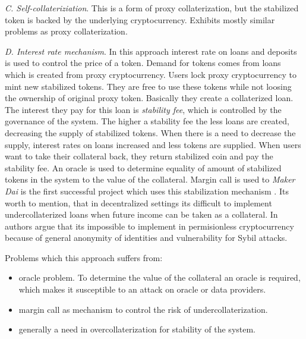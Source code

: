 \documentclass[12pt, a4paper, twocolumn]{article}
\begin{document}
\textit{C. Self-collateriziation}. This is a form of proxy collaterization, but the stabilized token is backed by the underlying cryptocurrency. Exhibits mostly similar problems as proxy collaterization.

\textit{D. Interest rate mechanism}. In this approach  interest rate on loans and deposits is used to control the price of a token. Demand for tokens comes from loans which is created from proxy cryptocurrency. Users lock proxy cryptocurrency to mint new stabilized tokens. They are free to use these tokens while not loosing the  ownership of original proxy token. Basically they create a collaterized loan. The interest they pay for this loan is \textit{stability fee}, which is controlled by the governance of the system. The higher a stability fee the less loans are created, decreasing the supply of stabilized tokens. When there is a need to decrease the supply, interest rates on loans increased and  less tokens are supplied. When users want to take their collateral back, they return stabilized coin and pay the stability fee. An oracle is used to determine equality of amount of stabilized tokens in the system to the value of the collateral. Margin call is used to  \textit{Maker Dai} is the first successful project which uses this stabilization mechanism \cite{dai}. 
Its worth to mention, that in decentralized settings its difficult to implement undercollaterized loans when future income can be taken as a collateral. In \cite{1905.11905} authors argue that its impossible to implement in permisionless cryptocurrency because of general anonymity of identities and vulnerability for Sybil attacks.

Problems which this approach suffers from:
\begin{itemize}
\item oracle problem. To determine the value of the collateral an oracle is required, which makes it susceptible to an attack on oracle or data providers. 
\item margin call as mechanism to control the risk of undercollaterization.
\item generally a need in overcollaterization for stability of the system.
\end{itemize}
\end{document}
